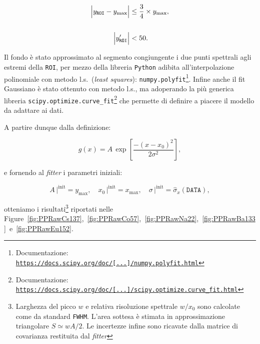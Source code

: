 \begin{align*}
\Bigl|y_\texttt{ROI} - y_\mathrm{max}\Bigr| &\leq \frac{3}{4} \times y_\mathrm{max}, \\
\\
\Bigl|y'_\texttt{ROI}\Bigr| &< 50.
\end{align*}

\noindent Il fondo è stato approssimato al segmento congiungente i due punti spettrali agli estremi della \texttt{ROI}, per mezzo della libreria \texttt{Python} adibita all'interpolazione polinomiale con metodo l.s.~\!(\emph{least squares}): \texttt{numpy.polyfit}\footnote{Documentazione: \href{https://docs.scipy.org/doc/numpy-1.15.0/reference/generated/numpy.polyfit.html}{\texttt{https://docs.scipy.org/doc/[...]/numpy.polyfit.html}}}. Infine anche il fit Gaussiano è stato ottenuto con metodo l.s., ma adoperando la più generica libreria \texttt{scipy.optimize.curve\_fit}\footnote{Documentazione: \href{https://docs.scipy.org/doc/scipy/reference/generated/scipy.optimize.curve_fit.html}{\texttt{https://docs.scipy.org/doc/[...]/scipy.optimize.curve\_fit.html}}} che permette di definire a piacere il modello da adattare ai dati.

\vfill

\noindent A partire dunque dalla definizione:

\vfill

\begin{equation*}
g(x) = A\,\exp\!\left[\frac{-(x-x_0)^2}{2\sigma^2}\right],
\end{equation*}
 
 \vfill
 
\noindent e fornendo al \emph{fitter} i parametri iniziali:

\vfill

\begin{equation*}
A\,\Bigr|^\mathrm{init} = y_\mathrm{max},\quad x_0\,\Bigr|^\mathrm{init} = x_\mathrm{max},\quad \sigma\,\Bigr|^\mathrm{init} = \hat{\sigma}_x(\texttt{DATA}),
\end{equation*}

\vfill

\noindent otteniamo i risultati\footnote{Larghezza del picco $w$ e relativa risoluzione spettrale $w/x_0$ sono calcolate come da standard \texttt{FWHM}. L'area sottesa è stimata in approssimazione triangolare $S\simeq wA/2$. Le incertezze infine sono ricavate dalla matrice di covarianza restituita dal \emph{fitter}} riportati nelle Figure~\ref{fig:PPRawCs137},~\ref{fig:PPRawCo57},~\ref{fig:PPRawNa22},~\ref{fig:PPRawBa133}~e~\ref{fig:PPRawEu152}.\\

